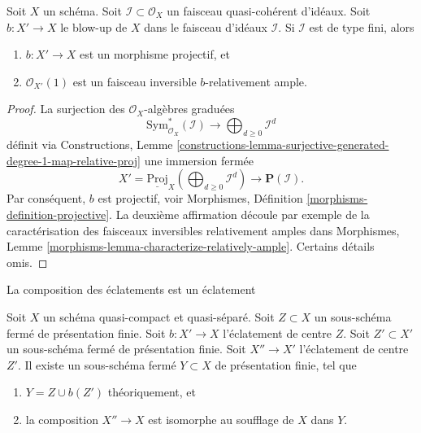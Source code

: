 \begin{lemma}
\label{lemma-blowing-up-projective}
Soit  $X$  un schéma. Soit  $\mathcal{I} \subset \mathcal{O}_X$  un faisceau quasi-cohérent
d'idéaux. Soit  $b : X' \to X$  le blow-up de  $X$  dans le faisceau d'idéaux
 $\mathcal{I}$. Si  $\mathcal{I}$  est de type fini, alors
\begin{enumerate}
\item $b : X' \to X$  est un morphisme projectif, et
\item $\mathcal{O}_{X'}(1)$  est un faisceau inversible  $b$-relativement ample.
\end{enumerate}
\end{lemma}

\begin{proof}
La surjection des  $\mathcal{O}_X$-algèbres graduées
$$
\text{Sym}_{\mathcal{O}_X}^*(\mathcal{I})
\longrightarrow
\bigoplus\nolimits_{d \geq 0} \mathcal{I}^d
$$
définit via Constructions, Lemme  \ref{constructions-lemma-surjective-generated-degree-1-map-relative-proj}  une immersion fermée
$$
X' = \underline{\text{Proj}}_X (\bigoplus\nolimits_{d \geq 0} \mathcal{I}^d)
\longrightarrow
\mathbf{P}(\mathcal{I}).
$$
Par conséquent,  $b$  est projectif, voir Morphismes, Définition
 \ref{morphisms-definition-projective}. La deuxième affirmation découle par exemple de la caractérisation
des faisceaux inversibles relativement amples dans Morphismes, Lemme  \ref{morphisms-lemma-characterize-relatively-ample}.
Certains détails omis.
\end{proof}

\begin{lemma}
\label{lemma-composition-finite-type-blowups}
\begin{slogan}
La composition des éclatements est un éclatement
\end{slogan}
Soit  $X$  un schéma quasi-compact et quasi-séparé. Soit  $Z \subset X$  un
sous-schéma fermé de présentation finie. Soit  $b : X' \to X$  l’éclatement de centre
 $Z$. Soit  $Z' \subset X'$  un sous-schéma fermé de présentation finie. Soit
 $X'' \to X'$  l’éclatement de centre  $Z'$. Il existe un sous-schéma fermé
 $Y \subset X$  de présentation finie, tel que
\begin{enumerate}
\item $Y = Z \cup b(Z')$  théoriquement, et
\item la composition  $X'' \to X$  est isomorphe au soufflage de  $X$  dans
 $Y$.
\end{enumerate}
\end{lemma}

